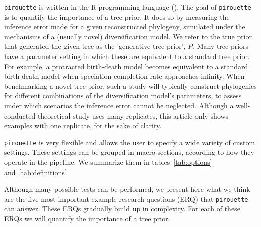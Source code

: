 \documentclass{article}
\begin{document}
\verb;pirouette; is written in the R programming language (\cite{R}).
The goal of \verb;pirouette; is to quantify the importance of a tree
prior.
It does so by measuring the inference error
made for a given reconstructed phylogeny, 
simulated under the mechanisms of a (usually novel) diversification model.
We refer to the true prior that generated the given tree
as the 'generative tree prior', $\mathit{P}$.
Many tree priors have a parameter setting in which these are equivalent
to a standard tree prior. For example, a protracted birth-death model
becomes equivalent to a standard birth-death model when speciation-completion rate approaches infinity.
When benchmarking a novel tree prior, 
such a study will typically construct phylogenies 
for different combinations of the diversification model's parameters, 
to assess under which scenarios the inference error cannot be neglected. 
Although a well-conducted theoretical study uses many replicates, 
this article only shows examples with one replicate, for the sake of clarity.

\verb;pirouette; is very flexible and allows the user 
to specify a wide variety of custom settings. 
These settings can be grouped in macro-sections, 
according to how they operate in the pipeline. 
We summarize them in tables~\ref{tab:options} and~\ref{tab:definitions}.

Although many possible tests can be performed, 
we present here what we think are the five most important 
example research questions (ERQ) that \verb;pirouette; can answer. 
These ERQs gradually build up in complexity.
For each of these ERQs we will quantify the importance of a tree prior.
\end{document}
